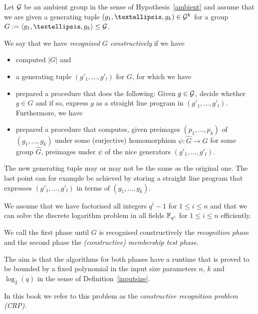 \begin{Problem}
\label{ProbCR3}%
%
Let $\mathcal{G}$ be an ambient group in the sense of Hypothesis~\ref{ambient} and 
assume that we are given a generating tuple $(g_1, \ldots, g_k) \in
\GG^k$ for a group $G := \left< g_1, \ldots, g_k \right> \le \GG$. 

We say that we have \emph{recognised $G$ constructively} if we have 
\begin{itemize}
\item computed $|G|$ and
\item a generating tuple $( g'_1, \ldots, g'_l )$ for $G$, for which we have
\item 
prepared a procedure that does the following: Given $g \in \mathcal{G}$,
decide whether $g \in G$ and if so, express $g$ as a straight line program
%
in $(g'_1, \ldots, g'_l)$. Furthermore, we have
\item prepared a procedure that computes, given preimages $(p_1, \ldots,
p_k)$ of $(g_1, \ldots, g_k)$ under some (surjective) homomorphism $\psi
: \hat G \to G$ for some group $\hat G$, preimages under $\psi$ of the
nice generators $(g'_1, \ldots, g'_l)$.
\end{itemize}
%
The new generating tuple may or may not be the same as the original one.
The last point can for example be achieved by storing a straight line
program that expresses $(g'_1, \ldots, g'_l)$ in terms of $(g_1, \ldots,
g_k)$.

We assume that we have factorised all integers $q^i-1$ for $1 \le i \le n$
and that we can solve the discrete logarithm problem in all fields
$\mathbb{F}_{q^i}$ for $1 \le i \le n$ efficiently. 

We call the first phase until $G$ is
recognised constructively the \emph{recognition phase} and the second
phase the \emph{(constructive) membership test phase}.
%
%

The aim is that the algorithms for both phases have a runtime that is proved
to be bounded by a fixed polynomial in the input size parameters $n$, $k$
and $\log_2(q)$ in the sense of Definition~\ref{inputsize}.

In this book we refer to this problem as the \emph{constructive recognition
problem (CRP)}.
%
\proofend
\end{Problem}

